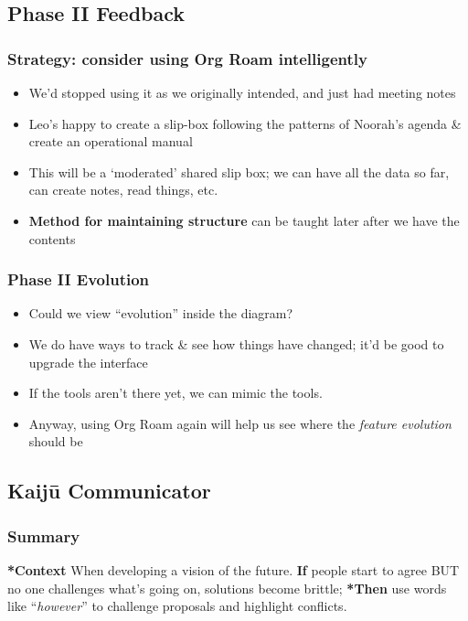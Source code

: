 \documentclass[11pt]{article}
\begin{document}
\subsection{Phase II Feedback}
\label{sec:orgb0c278a}

\subsubsection{Strategy: consider using Org Roam intelligently}
\label{sec:org5f47982}

\begin{itemize}
\item We’d stopped using it as we originally intended, and just had meeting notes
\item Leo’s happy to create a slip-box following the patterns of Noorah’s agenda \& create an operational manual
\item This will be a ‘moderated’ shared slip box; we can have all the data so far, can create notes, read things, etc.
\item \textbf{Method for maintaining structure} can be taught later after we have the contents
\end{itemize}

\subsubsection{Phase II Evolution}
\label{sec:org50e0b06}

\begin{itemize}
\item Could we view ``evolution'' inside the diagram?
\item We do have ways to track \& see how things have changed; it'd be good to upgrade the interface
\item If the tools aren't there yet, we can mimic the tools.
\item Anyway, using Org Roam again will help us see where the \emph{feature evolution} should be
\end{itemize}
\subsection{Kaijū Communicator}
\label{a0796d9e-664b-46fa-bb37-7f6a6fc15584}
\subsubsection{Summary}
\label{sec:org9894ee9}

\textbf{*Context} When developing a vision of the future. \textbf{If} people start to
agree BUT no one challenges what's going on, solutions become brittle;
\textbf{*Then} use words like ``\emph{however}'' to challenge proposals and highlight
conflicts.
\end{document}
